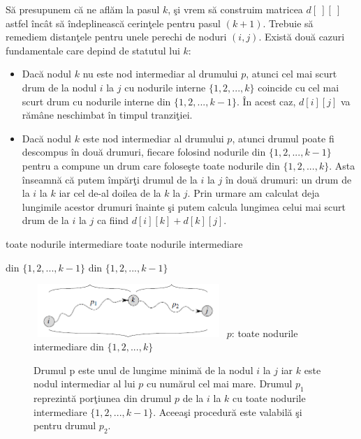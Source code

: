 \documentclass[11pt,a4paper]{report}
\begin{document}
    S\u a presupunem c\u a ne afl\u am la pasul $k$, \c si vrem s\u a construim matricea $d[\ ][\ ]$ astfel \^ inc\^ at s\u a \^ indeplineasc\u a cerin\c tele pentru pasul $(k+1)$. Trebuie s\u a remediem distan\c tele pentru unele perechi de noduri $(i,j)$. \cite{Cormen} Exist\u a dou\u a cazuri fundamentale care depind de statutul lui $k$:
     \begin{itemize}
    	\item Dac\u a nodul $k$ nu este nod intermediar al drumului $p$, atunci cel mai scurt drum de la nodul $i$ la $j$ cu nodurile interne $\{1,2,...,k\}$ coincide cu cel mai scurt drum cu nodurile interne din  $\{1,2,...,k-1\}$. \^ In acest caz, $d[i][j]$ va r\u am\^ ane neschimbat \^ in timpul tranzi\c tiei.
    	\item Dac\u a nodul $k$ este nod intermediar al drumului $p$, atunci drumul poate fi descompus \^ in dou\u a drumuri, fiecare folosind nodurile din $\{1,2,...,k-1\}$ pentru a compune un drum care folose\c ste toate nodurile din $\{1,2,...,k\}$. Asta \^ inseamn\u a c\u a putem \^ imp\u ar\c ti drumul de la $i$ la $j$ \^ in dou\u a drumuri: un drum de la $i$ la $k$ iar cel de-al doilea de la $k$ la $j$. Prin urmare am calculat deja lungimile acestor drumuri \^ inainte \c si putem calcula lungimea celui mai scurt drum de la $i$ la $j$ ca fiind $d[i][k]+d[k][j]$.
    \end{itemize}
\vspace{0.5cm}	
\hspace{1.6cm} {\scriptsize	toate nodurile intermediare \hspace{0.5cm} toate nodurile intermediare 
	
	\hspace{1.6cm}	din  $\{1,2,...,k-1\}$  \hspace{1.7cm}	din  $\{1,2,...,k-1\}$}
\begin{figure}[!hbt]
	\centering
	\hspace{0.5cm}
	\includegraphics[width=7.2cm,height=2cm]{Warshall.png}
	\newline
	{\scriptsize $p$: toate nodurile intermediare din $\{1,2,...,k\}$}
	\caption{Drumul p este unul de lungime minim\u a de la nodul $i$ la $j$ iar $k$ este nodul intermediar al lui $p$ cu num\u arul cel mai mare. Drumul $p_1$ reprezint\u a por\c tiunea din drumul $p$ de la $i$ la $k$ cu toate nodurile intermediare $\{1,2,...,k-1\}$. Aceea\c si procedur\u a este valabil\u a \c si pentru drumul $p_2$.}
\end{figure}
\end{document}
